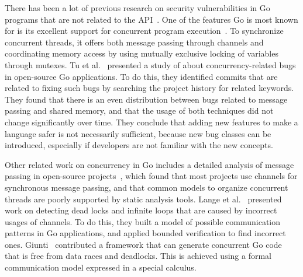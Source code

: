 There has been a lot of previous research on security vulnerabilities in Go programs that are not related to the
\unsafe{} \acrshort{API}~\cite{zhou2017, hill2002, hannan1998, choi1999}.
One of the features Go is most known for is its excellent support for concurrent program execution~\cite{donovan2015}.
To synchronize concurrent threads, it offers both message passing through channels and coordinating memory access by
using mutually exclusive locking of variables through mutexes.
Tu et al.~\cite{tu2019} presented a study of about  concurrency-related bugs in  open-source
Go applications.
To do this, they identified commits that are related to fixing such bugs by searching the project history for related
keywords.
They found that there is an even distribution between bugs related to message passing and shared memory, and that the
usage of both techniques did not change significantly over time.
They conclude that adding new features to make a language safer is not necessarily sufficient, because new bug classes
can be introduced, especially if developers are not familiar with the new concepts.

Other related work on concurrency in Go includes a detailed analysis of message passing in open-source
projects~\cite{dilley2019}, which found that most projects use channels for synchronous message passing, and that common
models to organize concurrent threads are poorly supported by static analysis tools.
Lange et al.~\cite{lange2017} presented work on detecting dead locks and infinite loops that are caused by incorrect
usages of channels.
To do this, they built a model of possible communication patterns in Go applications, and applied bounded verification
to find incorrect ones.
Giunti~\cite{giunti2020} contributed a framework that can generate concurrent Go code that is free from data races and
deadlocks.
This is achieved using a formal communication model expressed in a special calculus.


